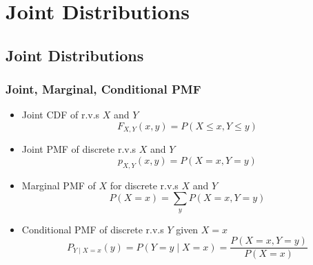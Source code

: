 \section{Joint Distributions}

\subsection{Joint Distributions}

\subsubsection*{Joint, Marginal, Conditional PMF}
\begin{itemize}
    \item Joint CDF of r.v.s $X$ and $Y$
    \begin{equation}
        F_{X,Y}(x,y)=P(X\leq x,Y\leq y)
    \end{equation}
    \item Joint PMF of discrete r.v.s $X$ and $Y$
    \begin{equation}
        p_{X,Y}(x,y)=P(X=x,Y=y)
    \end{equation}
    \item Marginal PMF of $X$ for discrete r.v.s $X$ and $Y$
    \begin{equation}
        P(X=x)=\sum_yP(X=x,Y=y)
    \end{equation}
    \item Conditional PMF of discrete r.v.s $Y$ given $X=x$
    \begin{equation}
        P_{Y\mid X=x}(y)=P(Y=y\mid X=x)=\frac{P(X=x,Y=y)}{P(X=x)}
    \end{equation}
\end{itemize}

